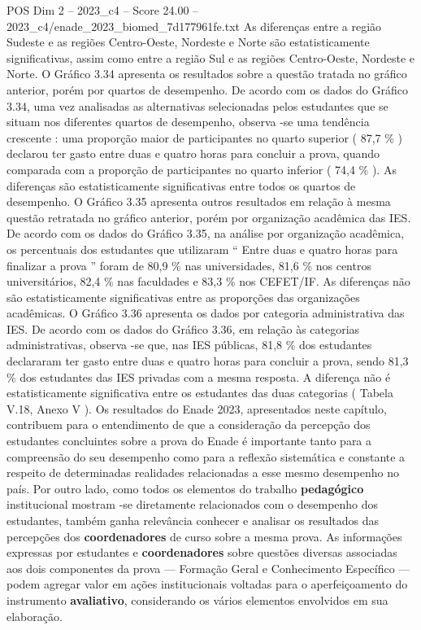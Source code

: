 \begin{textsample}{POS Dim 2 – 2023\_c4 – Score 24.00 – 2023\_c4/enade\_2023\_biomed\_7d177961fe.txt}
As diferenças entre a região Sudeste e as regiões Centro-Oeste, Nordeste e Norte são estatisticamente significativas, assim como entre a região Sul e as regiões Centro-Oeste, Nordeste e Norte.
O Gráfico 3.34 apresenta os resultados sobre a questão tratada no gráfico anterior, porém por quartos de desempenho.
De acordo com os dados do Gráfico 3.34, uma vez analisadas as alternativas selecionadas pelos estudantes que se situam nos diferentes quartos de desempenho, observa -se uma tendência crescente : uma proporção maior de participantes no quarto superior ( 87,7 \% ) declarou ter gasto entre duas e quatro horas para concluir a prova, quando comparada com a proporção de participantes no quarto inferior ( 74,4 \% ).
As diferenças são estatisticamente significativas entre todos os quartos de desempenho.
O Gráfico 3.35 apresenta outros resultados em relação à mesma questão retratada no gráfico anterior, porém por organização acadêmica das IES.
De acordo com os dados do Gráfico 3.35, na análise por organização acadêmica, os percentuais dos estudantes que utilizaram “ Entre duas e quatro horas para finalizar a prova ” foram de 80,9 \% nas universidades, 81,6 \% nos centros universitários, 82,4 \% nas faculdades e 83,3 \% nos CEFET/IF.
As diferenças não são estatisticamente significativas entre as proporções das organizações acadêmicas.
O Gráfico 3.36 apresenta os dados por categoria administrativa das IES.
De acordo com os dados do Gráfico 3.36, em relação às categorias administrativas, observa -se que, nas IES públicas, 81,8 \% dos estudantes declararam ter gasto entre duas e quatro horas para concluir a prova, sendo 81,3 \% dos estudantes das IES privadas com a mesma resposta.
A diferença não é estatisticamente significativa entre os estudantes das duas categorias ( Tabela V.18, Anexo V ).
Os resultados do Enade 2023, apresentados neste capítulo, contribuem para o entendimento de que a consideração da percepção dos estudantes concluintes sobre a prova do Enade é importante tanto para a compreensão do seu desempenho como para a reflexão sistemática e constante a respeito de determinadas realidades relacionadas a esse mesmo desempenho no país.
Por outro lado, como todos os elementos do trabalho \textbf{pedagógico} institucional mostram -se diretamente relacionados com o desempenho dos estudantes, também ganha relevância conhecer e analisar os resultados das percepções dos \textbf{coordenadores} de curso sobre a mesma prova.
As informações expressas por estudantes e \textbf{coordenadores} sobre questões diversas associadas aos dois componentes da prova — Formação Geral e Conhecimento Específico — podem agregar valor em ações institucionais voltadas para o aperfeiçoamento do instrumento \textbf{avaliativo}, considerando os vários elementos envolvidos em sua elaboração.

\end{textsample}
